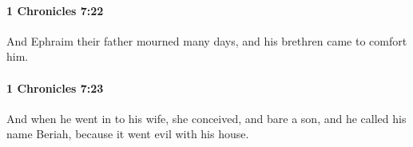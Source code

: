 		\paragraph{1 Chronicles 7:22} %
			\label{1CHRONICLES-7-22}

			And Ephraim their father mourned many days, and his brethren came to comfort him.


		\paragraph{1 Chronicles 7:23} %
			\label{1CHRONICLES-7-23}

			And when he went in to his wife, she conceived, and bare a son, and he called his name Beriah, because it went evil with his house.


